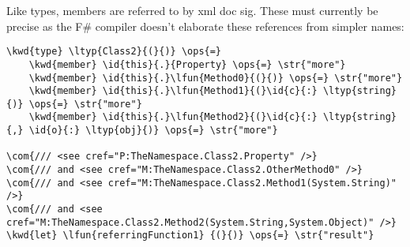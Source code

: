 \documentclass{article}
\newcommand{\id}[1]{\textcolor{black}{#1}}
\newcommand{\com}[1]{\textcolor{officegreen}{#1}}
\newcommand{\kwd}[1]{\textcolor{navy}{#1}}
\newcommand{\ops}[1]{\textcolor{purple}{#1}}
\newcommand{\str}[1]{\textcolor{olive}{#1}}
\begin{document}
Like types, members are referred to by xml doc sig.  These must currently be precise as the F\#
compiler doesn't elaborate these references from simpler names:
\begin{Verbatim}[commandchars=\\\{\}]
\kwd{type} \ltyp{Class2}{(}{)} \ops{=} 
    \kwd{member} \id{this}{.}{Property} \ops{=} \str{"more"}
    \kwd{member} \id{this}{.}\lfun{Method0}{(}{)} \ops{=} \str{"more"}
    \kwd{member} \id{this}{.}\lfun{Method1}{(}\id{c}{:} \ltyp{string}{)} \ops{=} \str{"more"}
    \kwd{member} \id{this}{.}\lfun{Method2}{(}\id{c}{:} \ltyp{string}{,} \id{o}{:} \ltyp{obj}{)} \ops{=} \str{"more"}

\com{/// <see cref="P:TheNamespace.Class2.Property" />}
\com{/// and <see cref="M:TheNamespace.Class2.OtherMethod0" />}
\com{/// and <see cref="M:TheNamespace.Class2.Method1(System.String)" />}
\com{/// and <see cref="M:TheNamespace.Class2.Method2(System.String,System.Object)" />}
\kwd{let} \lfun{referringFunction1} {(}{)} \ops{=} \str{"result"}
\end{Verbatim}
\end{document}
